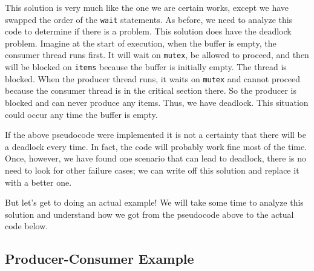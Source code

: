 This solution is very much like the one we are certain works, except we have swapped the order of the \texttt{wait} statements. As before, we need to analyze this code to determine if there is a problem. This solution does have the deadlock problem. Imagine at the start of execution, when the buffer is empty, the consumer thread runs first. It will wait on \texttt{mutex}, be allowed to proceed, and then will be blocked on \texttt{items} because the buffer is initially empty. The thread is blocked. When the producer thread runs, it waits on \texttt{mutex} and cannot proceed because the consumer thread is in the critical section there. So the producer is blocked and can never produce any items. Thus, we have deadlock. This situation could occur any time the buffer is empty.

If the above pseudocode were implemented it is not a certainty that there will be a deadlock every time. In fact, the code will probably work fine most of the time. Once, however, we have found one scenario that can lead to deadlock, there is no need to look for other failure cases; we can write off this solution and replace it with a better one.

But let's get to doing an actual example! We will take some time to analyze this solution and understand how we got from the pseudocode above to the actual code below.

\subsection*{Producer-Consumer Example}

